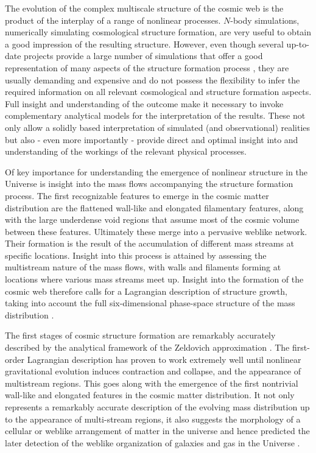 \documentclass[a4paper, 11pt]{article}
\begin{document}
The evolution of the complex multiscale structure of the cosmic web is
the product of the interplay of a range of nonlinear processes. $N$-body
simulations, numerically simulating cosmological structure formation,
are very useful to obtain a good impression of the resulting structure.
However, even though several up-to-date projects provide a large number
of simulations that offer a good representation of many aspects of
the structure formation process \citep{ABACUSSUMMIT:2021, Quijote:2020},
they are usually demanding and expensive and do not possess the flexibility
to infer the required information on all relevant cosmological and
structure formation aspects. Full insight and understanding of the outcome
make it necessary to invoke complementary analytical models for the
interpretation of the results. These not only allow a solidly based
interpretation of simulated (and observational) realities but also -
even more importantly - provide direct and optimal insight into and
understanding of the workings of the relevant physical processes.

Of key importance for understanding the emergence of nonlinear structure
in the Universe is insight into the mass flows accompanying the
structure formation process. The first recognizable features to emerge
in the cosmic matter distribution are the flattened wall-like
and elongated filamentary features, along with the large underdense void
regions that assume most of the cosmic volume between these features.
Ultimately these merge into a pervasive weblike network. Their formation
is the result of the accumulation of different mass streams
at specific locations. Insight into this process is attained by
assessing the multistream nature of the mass flows, with walls and
filaments forming at locations where various mass streams meet up.
Insight into the formation of the cosmic web therefore calls
for a Lagrangian description of structure growth, taking into account
the full six-dimensional phase-space structure of the
mass distribution \citep[see][for key contributions on
this.]{shandarin2010,shandarin2011,abel2011,falck2012}.

The first stages of cosmic structure formation are remarkably accurately
described by the analytical framework of the
Zeldovich approximation \citep{zeldovich1970}. The first-order
Lagrangian description has proven to work extremely well
until nonlinear gravitational evolution induces contraction and
collapse, and the appearance of multistream regions. This goes
along with the emergence of the first nontrivial wall-like and elongated
features in the cosmic matter distribution. It not
only represents a remarkably accurate description of the evolving mass
distribution up to the appearance
of multi-stream regions, it also suggests the morphology of a cellular
or weblike arrangement of matter in the universe and hence
predicted the later detection of the weblike organization of galaxies
and gas in the Universe
\citep{einasto19777,lapparent1986,colless2003,huchra2010,vipers2012}.
\end{document}
